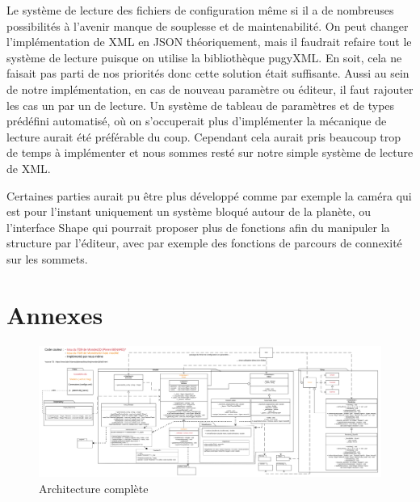 \documentclass[a4paper]{article}
\begin{document}
Le système de lecture des fichiers de configuration même si il a de nombreuses possibilités à l'avenir manque de souplesse et de maintenabilité. On peut changer l'implémentation de XML en JSON théoriquement, mais il faudrait refaire tout le système de lecture puisque on utilise la bibliothèque pugyXML. En soit, cela ne faisait pas parti de nos priorités donc cette solution était suffisante. Aussi au sein de notre implémentation, en cas de nouveau paramètre ou éditeur, il faut rajouter les cas un par un de lecture. Un système de tableau de paramètres et de types prédéfini automatisé, où on s'occuperait plus d'implémenter la mécanique de lecture aurait été préférable du coup. Cependant cela aurait pris beaucoup trop de temps à implémenter et nous sommes resté sur notre simple système de lecture de XML.

Certaines parties aurait pu être plus développé comme par exemple la caméra qui est pour l'instant uniquement un système bloqué autour de la planète, ou l'interface Shape qui pourrait proposer plus de fonctions afin du manipuler la structure par l'éditeur, avec par exemple des fonctions de parcours de connexité sur les sommets.

\newpage
\section{Annexes}

\begin{figure}[!ht]
    \begin{center}
        \includegraphics[width=1.5\linewidth, angle=90]{img/archi/Archi_Complete.png} 
        \caption{Architecture complète}
        \label{archiComplete}
    \end{center}
\end{figure}




\end{document}
